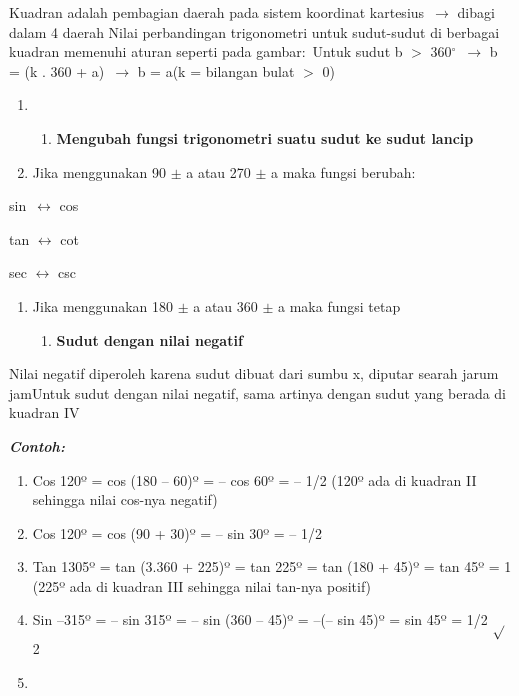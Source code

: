 \documentclass[11pt,fleqn]{book} %
\begin{document}
Kuadran adalah pembagian daerah pada sistem koordinat kartesius~$\mathrm{\to}$ dibagi dalam 4 daerah Nilai perbandingan trigonometri untuk sudut-sudut di berbagai kuadran memenuhi aturan seperti pada gambar:~Untuk sudut b $>$ 360${}^\circ$~$\mathrm{\to}$ b = (k . 360 + a)~$\mathrm{\to}$ b = a(k = bilangan bulat $>$ 0)\textbf{}

\begin{enumerate}
\item \begin{enumerate}
\item \textbf{ Mengubah fungsi trigonometri suatu sudut ke sudut lancip}
\end{enumerate}

\item  Jika menggunakan 90 $\pm$ a atau 270 $\pm$ a maka fungsi berubah:
\end{enumerate}

\noindent sin~$\mathrm{\leftrightarrow}$ cos

\noindent tan $\mathrm{\leftrightarrow}$ cot

\noindent sec $\mathrm{\leftrightarrow}$ csc

\begin{enumerate}
\item  Jika menggunakan 180 $\pm$ a atau 360 $\pm$ a maka fungsi tetap

\begin{enumerate}
\item  \textbf{Sudut dengan nilai negatif}
\end{enumerate}
\end{enumerate}

  Nilai negatif diperoleh karena sudut dibuat dari sumbu x, diputar searah jarum jamUntuk sudut dengan nilai negatif, sama artinya dengan sudut yang berada di kuadran IV

\noindent \textbf{\textit{Contoh:}}

\begin{enumerate}
\item  Cos 120º = cos (180 -- 60)º = -- cos 60º = -- 1/2 (120º ada di kuadran II sehingga nilai cos-nya negatif)

\item  Cos 120º = cos (90 + 30)º = -- sin 30º = -- 1/2

\item  Tan 1305º = tan (3.360 + 225)º = tan 225º = tan (180 + 45)º = tan 45º = 1 (225º ada di kuadran III sehingga nilai tan-nya positif)

\item  Sin --315º = -- sin 315º = -- sin (360 -- 45)º = --(-- sin 45)º = sin 45º = 1/2 $\mathrm{\sqrt{}}$2

\item  
\end{enumerate}
\end{document}
